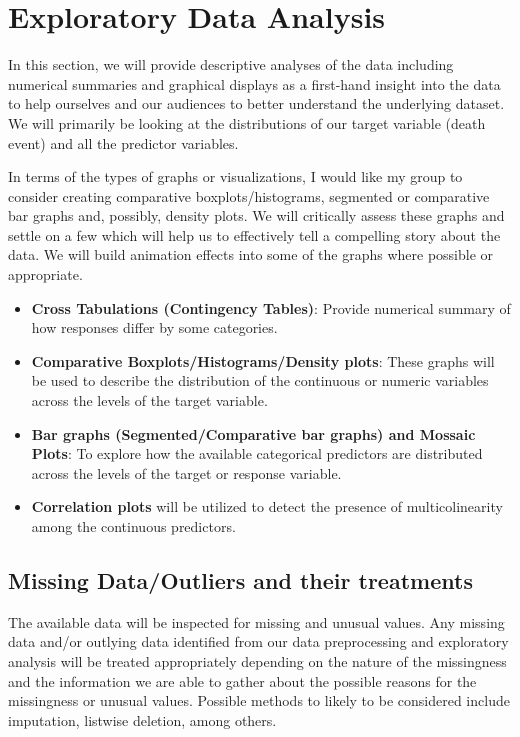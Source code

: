 \documentclass[
  10pt,
]{article}
\begin{document}
\section{Exploratory Data Analysis}

In this section, we will provide descriptive analyses of the data including numerical summaries and graphical displays as a first-hand insight into the data to help ourselves and our audiences to better understand the underlying dataset. We will primarily be looking at the distributions of our target variable (death event) and all the predictor variables.

In terms of the types of graphs or visualizations, I would like my group to consider creating comparative boxplots/histograms, segmented or comparative bar graphs and, possibly, density plots. We will critically assess these graphs and settle on a few which will help us to effectively tell a compelling story about the data. We will build animation effects into some of the graphs where possible or appropriate.

\begin{itemize}
\item
  \textbf{Cross Tabulations (Contingency Tables)}: Provide numerical summary of how responses differ by some categories.
\item
  \textbf{Comparative Boxplots/Histograms/Density plots}: These graphs will be used to describe the distribution of the continuous or numeric variables across the levels of the target variable.
\item
  \textbf{Bar graphs (Segmented/Comparative bar graphs) and Mossaic Plots}: To explore how the available categorical predictors are distributed across the levels of the target or response variable.
\item
  \textbf{Correlation plots} will be utilized to detect the presence of multicolinearity among the continuous predictors.
\end{itemize}

\subsection{Missing Data/Outliers and their treatments}

The available data will be inspected for missing and unusual values. Any missing data and/or outlying data identified from our data preprocessing and exploratory analysis will be treated appropriately depending on the nature of the missingness and the information we are able to gather about the possible reasons for the missingness or unusual values. Possible methods to likely to be considered include imputation, listwise deletion, among others.
\end{document}
